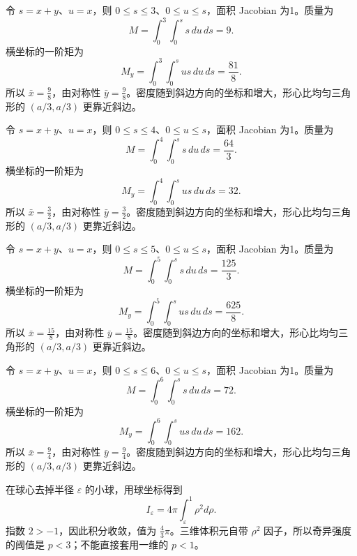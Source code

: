 \documentclass[UTF8,12pt,a4paper,fontset=fandol]{ctexart}
\begin{document}
\begin{solve}\label{ans:c40q9}
令 $s=x+y$、$u=x$，则 $0\le s\le 3$、$0\le u\le s$，面积 Jacobian 为1。质量为
\[
M=\int_0^{3}\int_0^s s\,du\,ds=9.
\]
横坐标的一阶矩为
\[
M_y=\int_0^{3}\int_0^s us\,du\,ds=\frac{81}{8}.
\]
所以 $\bar x=\frac{9}{8}$，由对称性 $\bar y=\frac{9}{8}$。密度随到斜边方向的坐标和增大，形心比均匀三角形的 $(a/3,a/3)$ 更靠近斜边。
\end{solve}

\begin{solve}\label{ans:c40q10}
令 $s=x+y$、$u=x$，则 $0\le s\le 4$、$0\le u\le s$，面积 Jacobian 为1。质量为
\[
M=\int_0^{4}\int_0^s s\,du\,ds=\frac{64}{3}.
\]
横坐标的一阶矩为
\[
M_y=\int_0^{4}\int_0^s us\,du\,ds=32.
\]
所以 $\bar x=\frac{3}{2}$，由对称性 $\bar y=\frac{3}{2}$。密度随到斜边方向的坐标和增大，形心比均匀三角形的 $(a/3,a/3)$ 更靠近斜边。
\end{solve}

\begin{solve}\label{ans:c40q11}
令 $s=x+y$、$u=x$，则 $0\le s\le 5$、$0\le u\le s$，面积 Jacobian 为1。质量为
\[
M=\int_0^{5}\int_0^s s\,du\,ds=\frac{125}{3}.
\]
横坐标的一阶矩为
\[
M_y=\int_0^{5}\int_0^s us\,du\,ds=\frac{625}{8}.
\]
所以 $\bar x=\frac{15}{8}$，由对称性 $\bar y=\frac{15}{8}$。密度随到斜边方向的坐标和增大，形心比均匀三角形的 $(a/3,a/3)$ 更靠近斜边。
\end{solve}

\begin{solve}\label{ans:c40q12}
令 $s=x+y$、$u=x$，则 $0\le s\le 6$、$0\le u\le s$，面积 Jacobian 为1。质量为
\[
M=\int_0^{6}\int_0^s s\,du\,ds=72.
\]
横坐标的一阶矩为
\[
M_y=\int_0^{6}\int_0^s us\,du\,ds=162.
\]
所以 $\bar x=\frac{9}{4}$，由对称性 $\bar y=\frac{9}{4}$。密度随到斜边方向的坐标和增大，形心比均匀三角形的 $(a/3,a/3)$ 更靠近斜边。
\end{solve}

\begin{solve}\label{ans:c40q13}
在球心去掉半径 $\varepsilon$ 的小球，用球坐标得到
\[
I_\varepsilon=4\pi\int_\varepsilon^1\rho^{2}d\rho.
\]
指数 $2>-1$，因此积分收敛，值为 $\frac{4}{3}\pi$。三维体积元自带 $\rho^2$ 因子，所以奇异强度的阈值是 $p<3$；不能直接套用一维的 $p<1$。
\end{solve}
\end{document}
